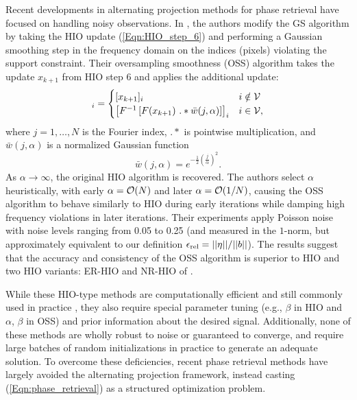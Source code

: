 Recent developments in alternating projection methods for phase retrieval have focused on handling noisy observations.  In \cite{rodriguez2013oversampling}, the authors modify the GS algorithm by taking the HIO update (\ref{Eqn:HIO_step_6}) and performing a Gaussian smoothing step in the frequency domain on the indices (pixels) violating the support constraint.  Their oversampling smoothness (OSS) algorithm takes the update $x_{k+1}$ from HIO step 6 and applies the additional update:
\begin{equation}
[x_{k+1}]_i =
	\begin{cases}
		[x_{k+1}]_i		&	i \notin \caV		\\
		\left[ F^{ -1} \left[ F ( x_{k+1}) \ .* \bar{w}(j, \alpha) \right]  \right]_i	&	 i \in \caV,
	\end{cases}
\end{equation}
where $j = 1, \ldots, N$ is the Fourier index, $.*$ is pointwise multiplication, and $\bar{w}(j, \alpha)$ is a normalized Gaussian function
\[
\bar{w}(j, \alpha) = e^ {- \frac{1}{2} \left(\frac{j}{\alpha} \right)^2}.
\]
As $\alpha \rightarrow \infty$, the original HIO algorithm is recovered.  The authors select $\alpha$ heuristically, with early $\alpha = {\mathcal O}(N)$ and later $\alpha = {\mathcal O}(1/N)$, causing the OSS algorithm to behave similarly to HIO during early iterations while damping high frequency violations in later iterations.  Their experiments \cite[Section 3]{rodriguez2013oversampling} apply Poisson noise with noise levels ranging from 0.05 to 0.25 (and measured in the $1$-norm, but approximately equivalent to our definition $\epsilon_\textnormal{rel} = ||\eta|| / ||b||$).  The results suggest that the accuracy and consistency of the OSS algorithm is superior to HIO and two HIO variants: ER-HIO and NR-HIO of \cite{martin2012noise}.  



While these HIO-type methods are computationally efficient and still commonly used in practice \cite{DBLP:journals/corr/JaganathanEH15a}, they also require special parameter tuning (e.g., $\beta$ in HIO and $\alpha$, $\beta$ in OSS) and prior information about the desired signal.  Additionally, none of these methods are wholly robust to noise or guaranteed to converge, and require large batches of random initializations in practice to generate an adequate solution.  To overcome these deficiencies, recent phase retrieval methods have largely avoided the alternating projection framework, instead casting (\ref{Eqn:phase_retrieval}) as a structured optimization problem.





